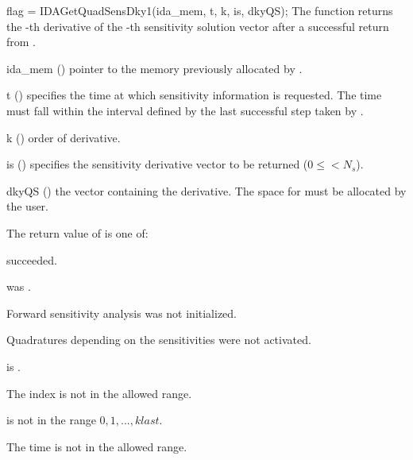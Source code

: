 {}
{
  flag = IDAGetQuadSensDky1(ida\_mem, t, k, is, dkyQS);
}
{
  The function  returns the -th derivative of the 
  -th sensitivity solution vector after a successful 
  return from .
}
{
  \begin{args}
  \item[ida\_mem] ()
    pointer to the memory previously allocated by .
  \item[t] ()
    specifies the time at which sensitivity information is 
    requested. The time  must fall within the interval defined by the last 
    successful step taken by {\idas}.
  \item[k] () order of derivative.
  \item[is] () specifies the sensitivity derivative vector to be returned
    ($0\le$$< N_s$).
  \item[dkyQS] ()
    the vector containing the derivative. The space for  must be allocated by 
    the user. 
  \end{args}
}
{
  The return value  of  is one of:
  \begin{args}
  \item[\Id{IDA\_SUCCESS}] 
     succeeded.
  \item[\Id{IDA\_MEM\_NULL}] 
     was .
  \item[\Id{IDA\_NO\_SENS}] 
    Forward sensitivity analysis was not initialized.
  \item[\Id{IDA\_NO\_QUADSENS}] 
    Quadratures depending on the sensitivities were not activated.
  \item[\Id{IDA\_BAD\_DKY}] 
     is .
  \item[\Id{IDA\_BAD\_IS}]
    The index  is not in the allowed range.
  \item[\Id{IDA\_BAD\_K}] 
     is not in the range $0, 1, ..., klast$.
  \item[\Id{IDA\_BAD\_T}] 
    The time  is not in the allowed range.
  \end{args}
}
{}



